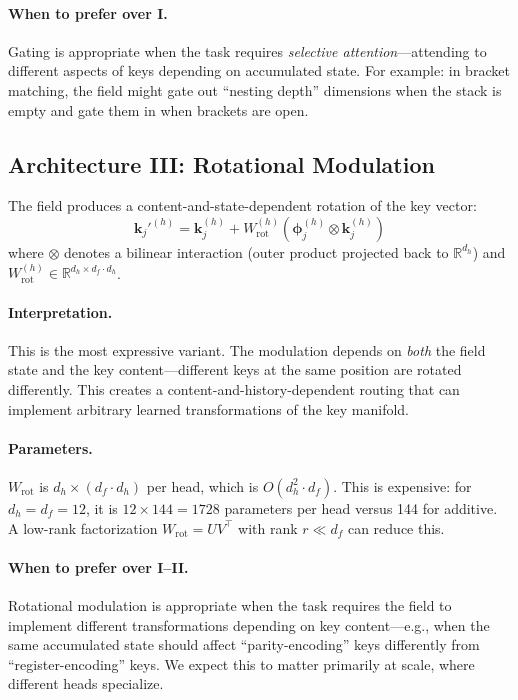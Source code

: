 \documentclass[11pt,a4paper]{article}
\newcommand{\field}{\bm{\phi}}
\newcommand{\R}{\mathbb{R}}
\newcommand{\K}{\bm{k}}
\begin{document}
\paragraph{When to prefer over I.}  Gating is appropriate when the
task requires \emph{selective attention}---attending to different
aspects of keys depending on accumulated state.  For example: in
bracket matching, the field might gate out ``nesting depth''
dimensions when the stack is empty and gate them in when brackets
are open.

\subsection{Architecture III: Rotational Modulation}
\label{sec:arch_rotational}

The field produces a content-and-state-dependent rotation of the key
vector:
\begin{equation}
    \K_j'^{(h)} = \K_j^{(h)} + W_{\text{rot}}^{(h)}
    (\field_j^{(h)} \otimes \K_j^{(h)})
    \label{eq:rotational_mod}
\end{equation}
where $\otimes$ denotes a bilinear interaction (outer product
projected back to $\R^{d_h}$) and
$W_{\text{rot}}^{(h)} \in \R^{d_h \times d_f \cdot d_h}$.

\paragraph{Interpretation.}  This is the most expressive variant.
The modulation depends on \emph{both} the field state and the key
content---different keys at the same position are rotated differently.
This creates a content-and-history-dependent routing that can
implement arbitrary learned transformations of the key manifold.

\paragraph{Parameters.}  $W_{\text{rot}}$ is $d_h \times (d_f \cdot
d_h)$ per head, which is $O(d_h^2 \cdot d_f)$.  This is expensive:
for $d_h = d_f = 12$, it is $12 \times 144 = 1728$ parameters per
head versus 144 for additive.  A low-rank factorization
$W_{\text{rot}} = U V^\top$ with rank $r \ll d_f$ can reduce this.

\paragraph{When to prefer over I--II.}  Rotational modulation is
appropriate when the task requires the field to implement different
transformations depending on key content---e.g., when the same
accumulated state should affect ``parity-encoding'' keys differently
from ``register-encoding'' keys.  We expect this to matter primarily
at scale, where different heads specialize.
\end{document}
